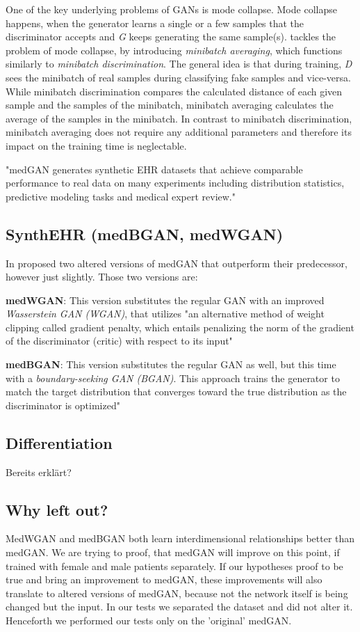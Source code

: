 \documentclass[11pt, a4paper]{book}
\begin{document}
One of the key underlying problems of GANs is mode collapse. Mode collapse happens, when the generator learns a single or a few samples that the discriminator accepts and \textit{G} keeps generating the same sample(s).
\citep{Choi2017} tackles the problem of mode collapse, by introducing \textit{minibatch averaging}, which functions similarly to \textit{minibatch discrimination}. The general idea is that during training, \textit{D} sees the minibatch of real samples during classifying fake samples and vice-versa.
While minibatch discrimination compares the calculated distance of each given sample and the samples of the minibatch, minibatch averaging calculates the average of the samples in the minibatch. In contrast to minibatch discrimination, minibatch averaging does not require any additional parameters and therefore its impact on the training time is neglectable. \cite{Choi2017}

"medGAN generates synthetic EHR datasets that achieve comparable performance to real data on many experiments including distribution statistics, predictive modeling tasks and medical expert review."

\subsection{SynthEHR (medBGAN, medWGAN)}
In \cite{Baowaly2018} proposed two altered versions of medGAN that outperform their predecessor, however just slightly.
Those two versions are:

\textbf{medWGAN}: This version substitutes the regular GAN with an improved \textit{Wasserstein GAN (WGAN)}, that utilizes "an alternative method of weight clipping called gradient penalty, which entails penalizing the norm of the gradient of the discriminator (critic) with respect to its input" \cite{Baowaly2018}

\textbf{medBGAN}: This version substitutes the regular GAN as well, but this time with a \textit{boundary-seeking GAN (BGAN)}. This approach trains the generator to match the target distribution that converges toward the true distribution as the discriminator is optimized" \cite{Baowaly2018}
\subsection{Differentiation}
Bereits erklärt?
\subsection{Why left out?}
MedWGAN and medBGAN both learn interdimensional relationships better than medGAN. We are trying to proof, that medGAN will improve on this point, if trained with female and male patients separately.
If our hypotheses proof to be true and bring an improvement to medGAN, these improvements will also translate to altered versions of medGAN, because not the network itself is being changed but the input. In our tests we separated the dataset and did not alter it. Henceforth we performed our tests only on the 'original' medGAN. 
\end{document}
